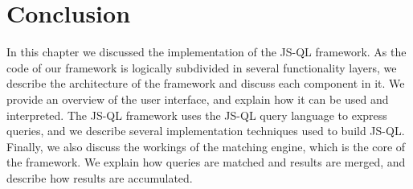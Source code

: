 \section{Conclusion}

In this chapter we discussed the implementation of the JS-QL framework. As the code of our framework is logically subdivided in several functionality layers, we describe the architecture of the framework and discuss each component in it. We provide an overview of the user interface, and explain how it can be used and interpreted. The JS-QL framework uses the JS-QL query language to express queries, and we describe several implementation techniques used to build JS-QL. Finally, we also discuss the workings of the matching engine, which is the core of the framework. We explain how queries are matched and results are merged, and describe how results are accumulated.


